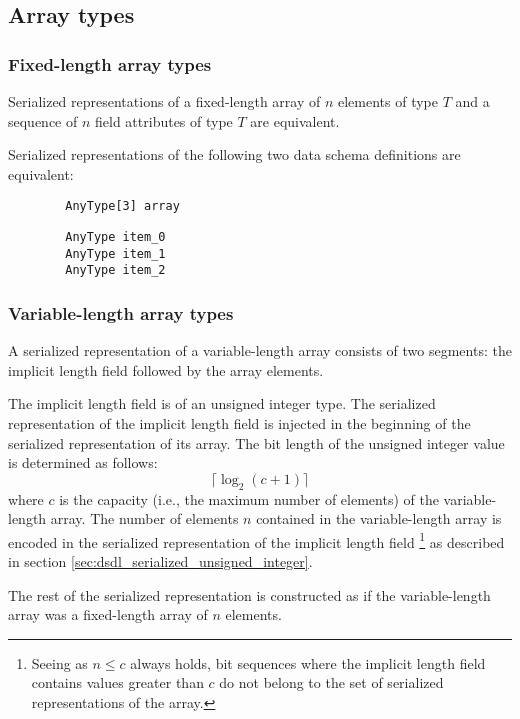 \subsection{Array types}

\subsubsection{Fixed-length array types}

Serialized representations of a fixed-length array of $n$ elements of type $T$ and
a sequence of $n$ field attributes of type $T$ are equivalent.

\begin{remark}
    Serialized representations of the following two data schema definitions are equivalent:

    \begin{verbatim}
        AnyType[3] array
    \end{verbatim}

    \begin{verbatim}
        AnyType item_0
        AnyType item_1
        AnyType item_2
    \end{verbatim}
\end{remark}

\subsubsection{Variable-length array types}

A serialized representation of a variable-length array consists of two segments:
the implicit length field followed by the array elements.

The implicit length field is of an unsigned integer type.
The serialized representation of the implicit length field
is injected in the beginning of the serialized representation of its array.
The bit length of the unsigned integer value is determined as follows:
$$\lceil{}\log_2 (c + 1)\rceil{}$$
where $c$ is the capacity (i.e., the maximum number of elements) of the variable-length array.
The number of elements $n$ contained in the variable-length array is encoded
in the serialized representation of the implicit length field%
\footnote{%
    Seeing as $n \leq c$ always holds, bit sequences where the implicit length field contains values
    greater than $c$ do not belong to the set of serialized representations of the array.
}
as described in section \ref{sec:dsdl_serialized_unsigned_integer}.

The rest of the serialized representation is constructed as if the variable-length array was
a fixed-length array of $n$ elements.

